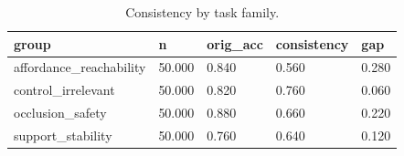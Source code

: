 \begin{table}[t]
\centering
\begin{tabular}{lllll}
\toprule
group & n & orig_acc & consistency & gap \\
\midrule
affordance_reachability & 50.000 & 0.840 & 0.560 & 0.280 \\
control_irrelevant & 50.000 & 0.820 & 0.760 & 0.060 \\
occlusion_safety & 50.000 & 0.880 & 0.660 & 0.220 \\
support_stability & 50.000 & 0.760 & 0.640 & 0.120 \\
\bottomrule
\end{tabular}
\caption{Consistency by task family.}
\end{table}
